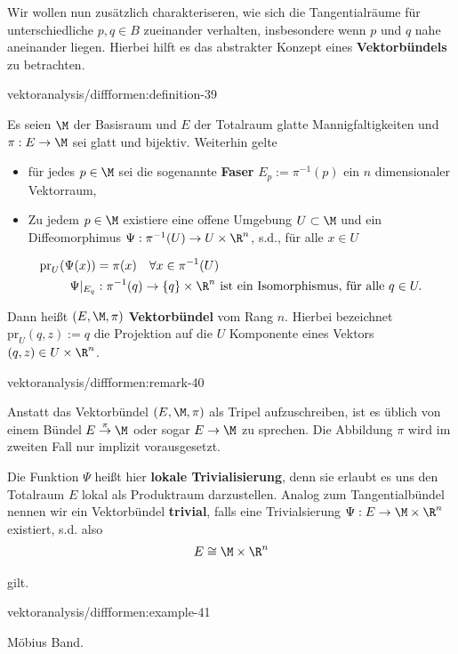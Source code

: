 \documentclass[letterpaper,10pt,english]{jupyterBook}
\begin{document}
\par
Wir wollen nun zusätzlich charakteriseren, wie sich die Tangentialräume für unterschiedliche \(p,q\in B\) zueinander verhalten, insbesondere wenn \(p\) und \(q\) nahe aneinander liegen. Hierbei hilft es das abstrakter Konzept eines \textbf{Vektorbündels} zu betrachten.
\begin{definition}{}{vektoranalysis/diffformen:definition-39}



\par
Es seien \(\M\) der Basisraum und \(E\) der Totalraum glatte Mannigfaltigkeiten und \(\pi:E\to \M\) sei glatt und bijektiv. Weiterhin gelte
\begin{itemize}
\item {} 
\par
für jedes \(p\in \M\) sei die sogenannte \textbf{Faser} \(E_p:= \pi^{-1}(p)\) ein \(n\) dimensionaler Vektorraum,

\item {} 
\par
Zu jedem \(p\in \M\) existiere eine offene Umgebung \(U\subset \M\) und ein Diffeomorphimus \(\Psi: \pi^{-1}(U)\to U\times\R^n\), s.d.,
für alle \(x\in U\)

\end{itemize}
\begin{align*}
\text{pr}_U(\Psi(x)) &= \pi(x)\quad\forall x\in \pi^{-1}(U)\\
\Psi\rvert_{E_q}&: \pi^{-1}(q) \to \{q\}\times \R^n \text{ ist ein Isomorphismus, für alle }q\in U.
\end{align*}
\par
Dann heißt \((E,\M,\pi)\) \textbf{Vektorbündel} vom Rang \(n\). Hierbei bezeichnet \(\text{pr}_U(q, z):= q\) die Projektion auf die \(U\) Komponente eines Vektors \((q,z)\in U\times\R^n\).
\end{definition}
\begin{remark}{}{vektoranalysis/diffformen:remark-40}



\par
Anstatt das Vektorbündel \((E,\M,\pi)\) als Tripel aufzuschreiben, ist es üblich von einem Bündel \(E\overset{\pi}{\to}\M\) oder sogar \(E\to\M\) zu sprechen. Die Abbildung \(\pi\) wird im zweiten Fall nur implizit vorausgesetzt.
\end{remark}

\par
Die Funktion \(\Psi\) heißt hier \textbf{lokale Trivialisierung}, denn sie erlaubt es uns den Totalraum \(E\) lokal als Produktraum darzustellen. Analog zum Tangentialbündel nennen wir ein Vektorbündel \textbf{trivial}, falls eine Trivialsierung \(\Psi:E\to \M\times\R^n\) existiert, s.d. also
\begin{align*}
E \cong \M\times\R^n
\end{align*}
\par
gilt.
\begin{example}{}{vektoranalysis/diffformen:example-41}



\par
Möbius Band.
\end{example}
\end{document}
